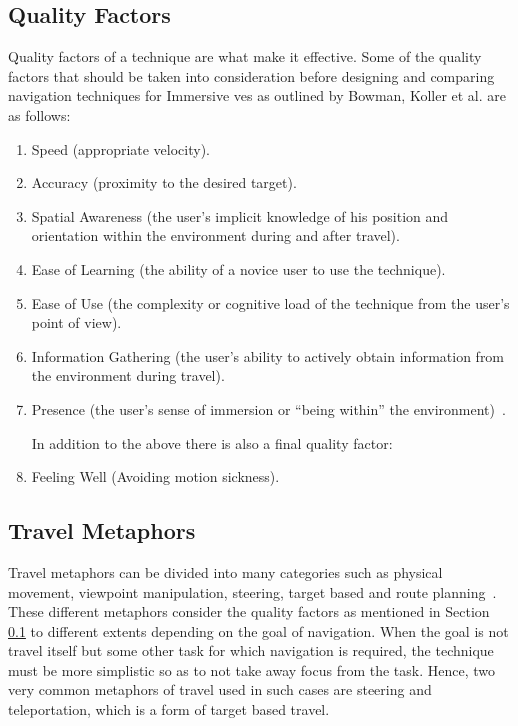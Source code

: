 \subsection{Quality Factors}
\label{subsection RW Navigation:Quality Factors}
Quality factors of a technique are what make it effective. Some of the quality factors that should be taken into consideration before designing and comparing navigation techniques for Immersive \acrshort{ve}s as outlined by Bowman, Koller et al. are as follows:
\begin{enumerate}
	\item Speed (appropriate velocity).
	\item Accuracy (proximity to the desired target).
	\item Spatial Awareness (the user’s implicit knowledge of his	position and orientation within the environment during
	and after travel).
	\item Ease of Learning (the ability of a novice user to use the	technique).
	\item Ease of Use (the complexity or cognitive load of the
	technique from the user’s point of view).
	\item Information Gathering (the user’s ability to actively
	obtain information from the environment during travel).
	\item Presence (the user’s sense of immersion or “being
	within” the environment)~\cite{Bowman1997}.
	
	In addition to the above there is also a final quality factor:
	\item Feeling Well (Avoiding motion sickness).
\end{enumerate}

\subsection{Travel Metaphors}
\label{subsection RW Navigation: Travel Metaphors}
Travel metaphors can be divided into many categories such as physical movement, viewpoint manipulation, steering, target based and route planning~\cite{Bowman2001}. These different metaphors consider the quality factors as mentioned in Section \ref{subsection RW Navigation:Quality Factors} to different extents depending on the goal of navigation. When the goal is not travel itself but some other task for which navigation is required, the technique must be more simplistic so as to not take away focus from the task. Hence, two very common metaphors of travel used in such cases are steering and teleportation, which is a form of target based travel.

